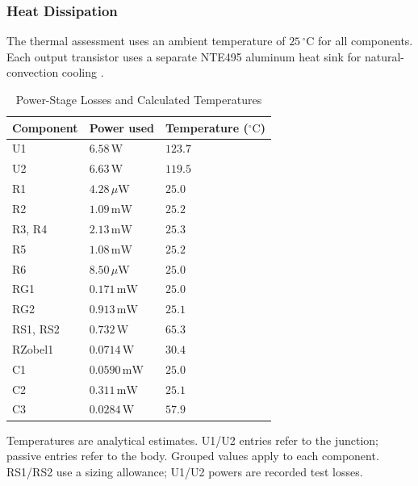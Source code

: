 \documentclass[conference,letterpaper]{IEEEtran}
\newcommand{\W}{\mathrm{W}}
\begin{document}
\subsubsection{Heat Dissipation}
The thermal assessment uses an ambient temperature of
$25\,{}^\circ\mathrm{C}$ for all components. Each output transistor
uses a separate NTE495 aluminum heat sink for natural-convection
cooling \cite{nte495}.
\begin{table}[H]
\caption{Power-Stage Losses and Calculated Temperatures}
\label{tab:thermal}
\centering\footnotesize
\setlength{\tabcolsep}{2pt}
\begin{tabular}{@{}p{}p{}p{}@{}}
\toprule
Component & Power used & Temperature (${}^\circ\mathrm{C}$)\\
\midrule
U1 & $6.58\,\W$ & $123.7$\\
U2 & $6.63\,\W$ & $119.5$\\
R1 & $4.28\,\mu\W$ & $25.0$\\
R2 & $1.09\,\mathrm{mW}$ & $25.2$\\
R3, R4 & $2.13\,\mathrm{mW}$ & $25.3$\\
R5 & $1.08\,\mathrm{mW}$ & $25.2$\\
R6 & $8.50\,\mu\W$ & $25.0$\\
RG1 & $0.171\,\mathrm{mW}$ & $25.0$\\
RG2 & $0.913\,\mathrm{mW}$ & $25.1$\\
RS1, RS2 & $0.732\,\W$ & $65.3$\\
RZobel1 & $0.0714\,\W$ & $30.4$\\
C1 & $0.0590\,\mathrm{mW}$ & $25.0$\\
C2 & $0.311\,\mathrm{mW}$ & $25.1$\\
C3 & $0.0284\,\W$ & $57.9$\\
\bottomrule
\end{tabular}
\par\smallskip
\parbox{.97\columnwidth}{\scriptsize Temperatures are analytical estimates. U1/U2 entries refer to the junction; passive entries refer to the body. Grouped values apply to each component. RS1/RS2 use a sizing allowance; U1/U2 powers are recorded test losses.}
\end{table}
\FloatBarrier
\end{document}

